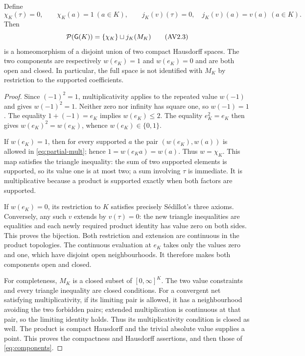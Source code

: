 \begin{theorem}\label{thm:decomposition}
Define
\[
 \chi_K(\tau)=0,\qquad \chi_K(a)=1\ (a\in K),
 \qquad
 j_K(v)(\tau)=0,\quad j_K(v)(a)=v(a)\ (a\in K).
\]
Then
\[
 \mathcal P(\mathsf G(K))=\{\chi_K\}\sqcup j_K(M_K)
 \tag{AV2.3}\label{eq:components}
\]
is a homeomorphism of a disjoint union of two compact Hausdorff spaces.
The two components are respectively $w(e_K)=1$ and $w(e_K)=0$ and are
both open and closed. In particular, the full space is not identified
with $M_K$ by restriction to the supported coefficients.
\end{theorem}
\begin{proof}
Since $(-1)^2=1$, multiplicativity applies to the repeated value
$w(-1)$ and gives $w(-1)^2=1$. Neither zero nor infinity has square one,
so $w(-1)=1$. The equality $1+(-1)=e_K$ implies $w(e_K)\le2$.
The equality $e_K^2=e_K$ then gives $w(e_K)^2=w(e_K)$, whence
$w(e_K)\in\{0,1\}$.

If $w(e_K)=1$, then for every supported $a$ the pair
$(w(e_K),w(a))$ is allowed in \eqref{eq:partial-mult}; hence
$1=w(e_Ka)=w(a)$. Thus $w=\chi_K$. This map satisfies the triangle
inequality: the sum of two supported elements is supported, so its
value one is at most two; a sum involving $\tau$ is immediate.
It is multiplicative because a product is supported exactly when both
factors are supported.

If $w(e_K)=0$, its restriction to $K$ satisfies precisely S\'edillot's
three axioms. Conversely, any such $v$ extends by $v(\tau)=0$:
the new triangle inequalities are equalities and each newly required
product identity has value zero on both sides. This proves the bijection.
Both restriction and extension are continuous in the product topologies.
The continuous evaluation at $e_K$ takes only the values zero and one,
which have disjoint open neighbourhoods. It therefore makes both
components open and closed.

For completeness, $M_K$ is a closed subset of $[0,\infty]^K$.
The two value constraints and every triangle inequality are closed
conditions. For a convergent net satisfying multiplicativity, if its
limiting pair is allowed, it has a neighbourhood avoiding the two
forbidden pairs; extended multiplication is continuous at that pair,
so the limiting identity holds. Thus its multiplicativity condition
is closed as well. The product is compact Hausdorff and the trivial
absolute value supplies a point. This proves the compactness and
Hausdorff assertions, and then those of \eqref{eq:components}.
\end{proof}

